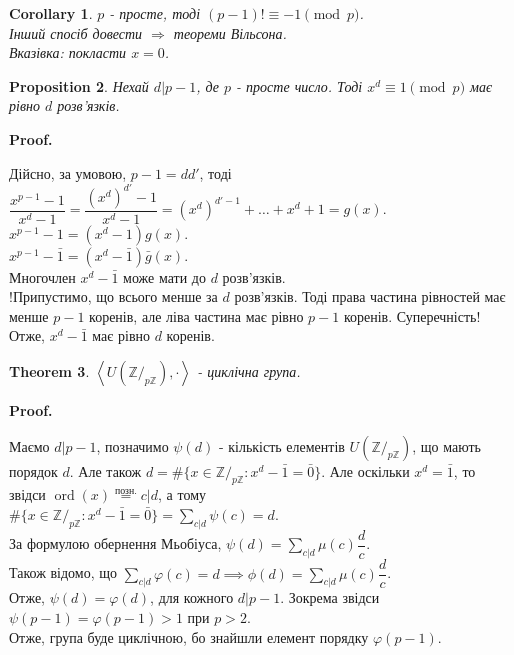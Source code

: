 \documentclass[a4paper, 10pt]{article}
\makeatletter
\theoremstyle{theoremdd}
\newtheorem{theorem}{Theorem}[subsection]
\theoremstyle{theoremdd}
\theoremstyle{theoremdd}
\theoremstyle{theoremdd}
\theoremstyle{theoremdd}
\newtheorem{proposition}[theorem]{Proposition}
\theoremstyle{theoremdd}
\theoremstyle{theoremdd}
\theoremstyle{theoremdd}
\newtheorem{corollary}[theorem]{Corollary}
\def\rightproof{$\boxed{\Rightarrow}$ }
\renewenvironment{proof}[1][Proof.\\]{\par
\pushQED{\hfill \qed}%
\normalfont \topsep6\p@\@plus6\p@\relax
\trivlist
\item\relax
{\bfseries
#1\@addpunct{.}}\hspace\labelsep\ignorespaces
}{%
\popQED\endtrivlist\@endpefalse
}
\DeclareMathOperator{\ord}{ord}
\makeatother
\begin{document}
\begin{corollary}
$p$ - просте, тоді $(p-1)! \equiv - 1 \pmod p$.\\
\textit{Інший спосіб довести \rightproof теореми Вільсона.}\\
\textit{Вказівка: покласти $x = 0$.}
\end{corollary}

\begin{proposition}
Нехай $d | p-1$, де $p$ - просте число. Тоді $x^d \equiv 1 \pmod p$ має рівно $d$ розв'язків.
\end{proposition}

\begin{proof}
Дійсно, за умовою, $p-1 = dd'$, тоді\\
$\dfrac{x^{p-1}-1}{x^d-1} = \dfrac{(x^d)^{d'}-1}{x^d-1} = (x^d)^{d'-1} + \dots + x^d + 1 = g(x)$.\\
$x^{p-1}-1 = (x^d-1)g(x)$.\\
$x^{p-1}-\bar{1} = (x^d-\bar{1})\bar{g}(x)$.\\
Многочлен $x^d - \bar{1}$ може мати до $d$ розв'язків.\\
!Припустимо, що всього менше за $d$ розв'язків. Тоді права частина рівностей має менше $p-1$ коренів, але ліва частина має рівно $p-1$ коренів. Суперечність!\\
Отже, $x^d - \bar{1}$ має рівно $d$ коренів.
\end{proof}

\begin{theorem}
$\left<U(\mathbb{Z}/_{p\mathbb{Z}}), \cdot \right>$ - циклічна група.
\end{theorem}

\begin{proof}
Маємо $d|p-1$, позначимо $\psi(d)$ - кількість елементів $U(\mathbb{Z}/_{p\mathbb{Z}})$, що мають порядок $d$. Але також $d = \#\{ x \in \mathbb{Z}/_{p \mathbb{Z}}: x^d - \bar{1} = \bar{0} \}$. Але оскільки $x^d = \bar{1}$, то звідси $\ord (x) \overset{\text{позн.}}{=} c | d$, а тому\\
$\# \{x \in \mathbb{Z}/_{p \mathbb{Z}}: x^d - \bar{1} = \bar{0}\} = \displaystyle\sum_{c | d} \psi(c) = d$.\\
За формулою обернення Мьобіуса, $\displaystyle \psi(d) = \sum_{c | d} \mu(c) \dfrac{d}{c}$.\\
Також відомо, що $\displaystyle\sum_{c | d} \varphi(c) = d \implies \phi(d) = \sum_{ c | d} \mu(c) \dfrac{d}{c}$.\\
Отже, $\psi(d) = \varphi(d)$, для кожного $d | p-1$. Зокрема звідси $\psi(p-1) = \varphi(p-1) > 1$ при $p > 2$.\\
Отже, група буде циклічною, бо знайшли елемент порядку $\varphi(p-1)$.
\end{proof}
\end{document}
